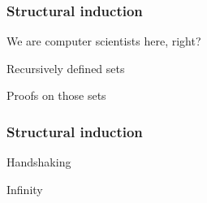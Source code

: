 \begin{frame}
  \frametitle{Structural induction}

  We are computer scientists here, right?

  Recursively defined sets

  Proofs on those sets
\end{frame}

\begin{frame}
  \frametitle{Structural induction}

  Handshaking

  Infinity

\end{frame}

